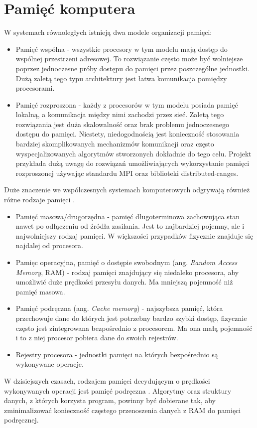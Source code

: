 \documentclass[a4paper,12pt]{book} %
\begin{document}
\section{Pamięć komputera}
W systemach równoległych istnieją dwa modele organizacji pamięci:
\begin{itemize}
	\item Pamięć wspólna - wszystkie procesory w tym modelu mają dostęp do wspólnej przestrzeni adresowej. To rozwiązanie często może być wolniejsze poprzez jednoczesne próby dostępu do pamięci przez poszczególne jednostki. Dużą zaletą tego typu architektury jest łatwa komunikacja pomiędzy procesorami.
	\item Pamięć rozproszona - każdy z procesorów w tym modelu posiada pamięć lokalną, a komunikacja między nimi zachodzi przez sieć. Zaletą tego rozwiązania jest duża skalowalność oraz brak problemu jednoczesnego dostępu do pamięci. Niestety, niedogodnością jest konieczność stosowania bardziej skomplikowanych mechanizmów komunikacji oraz często wyspecjalizowanych algorytmów stworzonych dokładnie do tego celu. Projekt przykłada dużą uwagę do rozwiązań umożliwiających wykorzystanie pamięci rozproszonej używając standardu MPI oraz biblioteki distributed-ranges.
\end{itemize}
Duże znaczenie we współczesnych systemach komputerowych odgrywają również różne rodzaje pamięci \cite{hierarchia-pamieci}.
\begin{itemize}
	\item Pamięć masowa/drugorzędna - pamięć długoterminowa zachowująca stan nawet po odłączeniu od źródła zasilania. Jest to najbardziej pojemny, ale i najwolniejszy rodzaj pamięci. W większości przypadków fizycznie znajduje się najdalej od procesora.
	\item Pamięc operacyjna, pamięć o dostępie swobodnym (ang. \emph{Random Access Memory}, RAM) - rodzaj pamięci znajdujący się niedaleko procesora, aby umożliwić duże prędkości przesyłu danych. Ma mniejszą pojemność niż pamięć masowa.
	\item Pamięć podręczna (ang. \emph{Cache memory}) - najszybsza pamięć, która przechowuje dane do których jest potrzebny bardzo szybki dostęp, fizycznie często jest zintegrowana bezpośrednio z procesorem. Ma ona małą pojemność i to z niej procesor pobiera dane do swoich rejestrów.
	\item Rejestry procesora - jednostki pamięci na których bezpośrednio są wykonywane operacje.
\end{itemize}
W dzisiejszych czasach, rodzajem pamięci decydującym o prędkości wykonywanych operacji jest pamięć podręczna \cite{cache-memory}. Algorytmy oraz struktury danych, z których korzysta program, powinny być dobierane tak, aby zminimalizować konieczność częstego przenoszenia danych z RAM do pamięci podręcznej.
\end{document}
